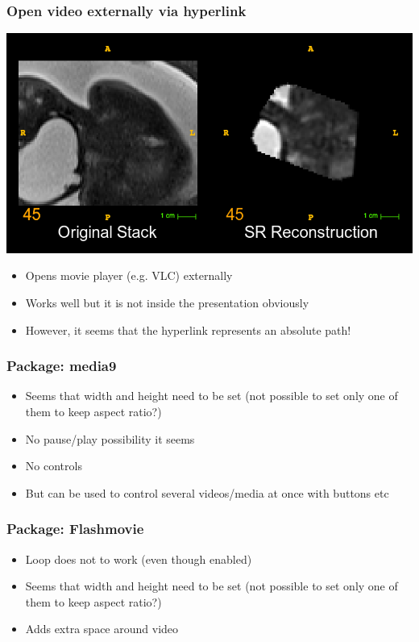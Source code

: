 \documentclass[compress,12pt,handout]{beamer} %
\begin{document}
\begin{frame}[t]\frametitle{Open video externally via hyperlink}    
  \begin{center}
    \href{run:movies/axial_view.mp4}{\includegraphics[scale=0.25]{./movies/axial_view.png}}
  \end{center}
  \begin{itemize}
    \item Opens movie player (e.g. VLC) externally
    \item Works well but it is not inside the presentation obviously
    \item However, it seems that the hyperlink represents an absolute path! 
  \end{itemize}
\end{frame}
\begin{frame}[t]\frametitle{Package: media9} 
  \begin{itemize}
    \item Seems that width and height need to be set (not possible to set only one of them to keep aspect ratio?)
    \item No pause/play possibility it seems
    \item No controls
    \item But can be used to control several videos/media at once with buttons etc
  \end{itemize}
\end{frame}


\begin{frame}[t]\frametitle{Package: Flashmovie}\centering
  \begin{itemize}
    \item Loop does not to work (even though enabled)
    \item Seems that width and height need to be set (not possible to set only one of them to keep aspect ratio?)
    \item Adds extra space around video
  \end{itemize}
\end{frame}
\end{document}

